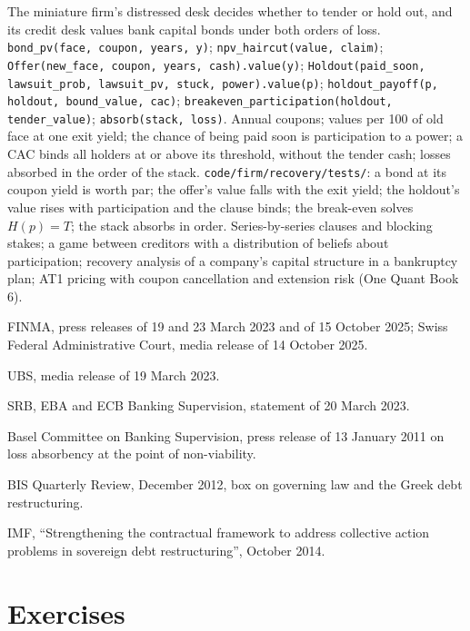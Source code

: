 \begin{build}
 The miniature firm's distressed desk decides whether to tender or hold
out, and its credit desk values bank capital bonds under both orders of loss.
 \texttt{bond\_pv(face, coupon, years, y)}; \texttt{npv\_haircut(value,
claim)}; \texttt{Offer(new\_face, coupon, years, cash).value(y)};
\texttt{Holdout(paid\_soon, lawsuit\_prob, lawsuit\_pv, stuck, power).value(p)};
\texttt{holdout\_payoff(p, holdout, bound\_value, cac)};
\texttt{breakeven\_participation(holdout, tender\_value)}; \texttt{absorb(stack, loss)}.
 Annual coupons; values per 100 of old face at one exit yield; the chance
of being paid soon is participation to a power; a CAC binds all holders at or above
its threshold, without the tender cash; losses absorbed in the order of the stack.
 \texttt{code/firm/recovery/tests/}: a bond at its coupon yield
is worth par; the offer's value falls with the exit yield; the holdout's value rises
with participation and the clause binds; the break-even solves $H(p) = T$; the stack
absorbs in order.
 Series-by-series clauses and blocking stakes; a game between creditors
with a distribution of beliefs about participation; recovery analysis of a company's
capital structure in a bankruptcy plan; AT1 pricing with coupon cancellation and
extension risk (One Quant Book 6).
\end{build}

\begin{omsources}
\item FINMA, press releases of 19 and 23 March 2023 and of 15 October 2025; Swiss
Federal Administrative Court, media release of 14 October 2025.
\item UBS, media release of 19 March 2023.
\item SRB, EBA and ECB Banking Supervision, statement of 20 March 2023.
\item Basel Committee on Banking Supervision, press release of 13 January 2011 on loss
absorbency at the point of non-viability.
\item BIS Quarterly Review, December 2012, box on governing law and the Greek debt
restructuring.
\item IMF, ``Strengthening the contractual framework to address collective action
problems in sovereign debt restructuring'', October 2014.
\end{omsources}

\section{Exercises}

